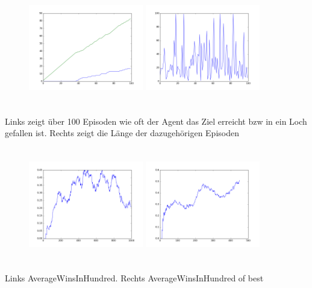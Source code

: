 \documentclass{ocbeameruni}
\begin{document}
\begin{frame}{2.3}
\begin{figure}[ht]
    \centering
    \includegraphics[width=50mm, height=50mm]{plots/figure_1.png} 
    \includegraphics[width=50mm, height=50mm]{plots/figure_2.png} 
\end{figure}
Links zeigt über 100 Episoden wie oft der Agent das Ziel erreicht bzw in ein Loch gefallen ist. Rechts zeigt die Länge der dazugehörigen Episoden
 
\end{frame}

\begin{frame}{2.3}
\begin{figure}[ht]
    \centering
    \includegraphics[width=50mm, height=50mm]{plots/figure_3.png} 
    \includegraphics[width=50mm, height=50mm]{plots/figure_4.png} 
\end{figure}
Links AverageWinsInHundred. Rechts AverageWinsInHundred of best
\end{frame}
\end{document}
